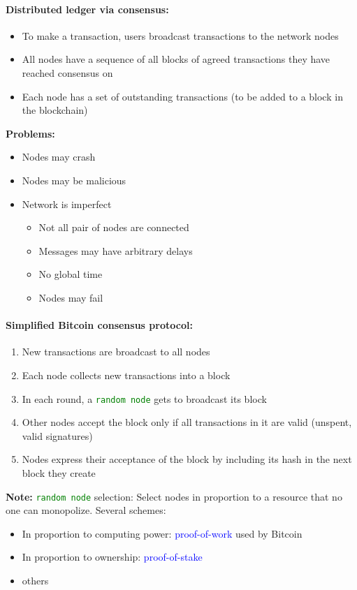 \paragraph{Distributed ledger via consensus: }
\begin{itemize}
    \item To make a transaction, users broadcast transactions to the network nodes
    \item All nodes have a sequence of all blocks of agreed transactions they have reached consensus on
    \item Each node has a set of outstanding transactions (to be added to a block in the blockchain)
\end{itemize}
\textbf{Problems: }
\begin{itemize}
    \item Nodes may crash 
    \item Nodes may be malicious
    \item Network is imperfect
    \begin{itemize}
        \item Not all pair of nodes are connected
        \item Messages may have arbitrary delays
        \item No global time
        \item Nodes may fail 
    \end{itemize}{}
\end{itemize}
\paragraph{Simplified Bitcoin consensus protocol: }
\begin{enumerate}
    \item New transactions are broadcast to all nodes
    \item Each node collects new transactions into a block
    \item In each round, a \texttt{\textcolor{green}{random node}} gets to broadcast its block
    \item Other nodes accept the block only if all transactions in it are valid (unspent, valid signatures)
    \item Nodes express their acceptance of the block by including its hash in the next block they create
\end{enumerate}{}
\textbf{Note: }  \texttt{\textcolor{green}{random node}} selection: 
Select nodes in proportion to a resource that no one can monopolize. Several schemes:
\begin{itemize}
    \item In proportion to computing power: \textcolor{blue}{proof-of-work} used by Bitcoin
    \item In proportion to ownership: \textcolor{blue}{proof-of-stake}
    \item others
\end{itemize}{}
